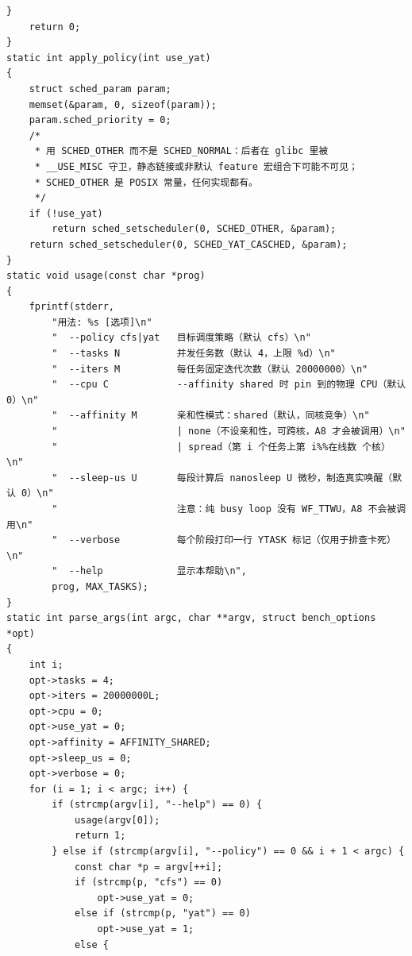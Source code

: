 \documentclass[10pt,a4paper]{article}
\newenvironment{yatpage}{\vspace*{0pt}}{\par}
\begin{document}
\begin{yatpage}
\begin{Verbatim}[fontsize=\fontsize{8.2}{9.8}\selectfont]
	}
	return 0;
}
static int apply_policy(int use_yat)
{
	struct sched_param param;
	memset(&param, 0, sizeof(param));
	param.sched_priority = 0;
	/*
	 * 用 SCHED_OTHER 而不是 SCHED_NORMAL：后者在 glibc 里被
	 * __USE_MISC 守卫，静态链接或非默认 feature 宏组合下可能不可见；
	 * SCHED_OTHER 是 POSIX 常量，任何实现都有。
	 */
	if (!use_yat)
		return sched_setscheduler(0, SCHED_OTHER, &param);
	return sched_setscheduler(0, SCHED_YAT_CASCHED, &param);
}
static void usage(const char *prog)
{
	fprintf(stderr,
		"用法: %s [选项]\n"
		"  --policy cfs|yat   目标调度策略（默认 cfs）\n"
		"  --tasks N          并发任务数（默认 4，上限 %d）\n"
		"  --iters M          每任务固定迭代次数（默认 20000000）\n"
		"  --cpu C            --affinity shared 时 pin 到的物理 CPU（默认 0）\n"
		"  --affinity M       亲和性模式：shared（默认，同核竞争）\n"
		"                     | none（不设亲和性，可跨核，A8 才会被调用）\n"
		"                     | spread（第 i 个任务上第 i%%在线数 个核）\n"
		"  --sleep-us U       每段计算后 nanosleep U 微秒，制造真实唤醒（默认 0）\n"
		"                     注意：纯 busy loop 没有 WF_TTWU，A8 不会被调用\n"
		"  --verbose          每个阶段打印一行 YTASK 标记（仅用于排查卡死）\n"
		"  --help             显示本帮助\n",
		prog, MAX_TASKS);
}
static int parse_args(int argc, char **argv, struct bench_options *opt)
{
	int i;
	opt->tasks = 4;
	opt->iters = 20000000L;
	opt->cpu = 0;
	opt->use_yat = 0;
	opt->affinity = AFFINITY_SHARED;
	opt->sleep_us = 0;
	opt->verbose = 0;
	for (i = 1; i < argc; i++) {
		if (strcmp(argv[i], "--help") == 0) {
			usage(argv[0]);
			return 1;
		} else if (strcmp(argv[i], "--policy") == 0 && i + 1 < argc) {
			const char *p = argv[++i];
			if (strcmp(p, "cfs") == 0)
				opt->use_yat = 0;
			else if (strcmp(p, "yat") == 0)
				opt->use_yat = 1;
			else {
\end{Verbatim}
\end{yatpage}
\newpage
\end{document}
